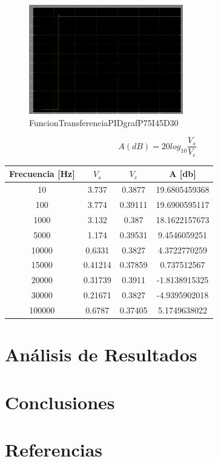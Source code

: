 \documentclass[]{article}
\begin{document}
\begin{figure}[h!]
	\centering
	\includegraphics[width=0.6\textwidth]{Imagenes/FuncionTransferenciaPIDgrafP75I45D30}
	\caption{FuncionTransferenciaPIDgrafP75I45D30}
	\label{FuncionTransferenciaPIDgrafP75I45D30}
\end{figure}



\begin{equation}
A(dB)=20log_{10}\frac{V_s}{V_e}
\end{equation}




\begin{table}[h!]
	\centering
	\begin{tabular}{|c|c|c|c|}
		\hline
		Frecuencia [Hz] & $V_s$    & $V_e$    & A [db]    \\ \hline
		10                  & 3.737   & 0.3877  & 19.6805459368 \\ \hline
		100                 & 3.774   & 0.39111 & 19.6900595117 \\ \hline
		1000                & 3.132   & 0.387   & 18.1622157673 \\ \hline
		5000                & 1.174   & 0.39531 & 9.4546059251  \\ \hline
		10000               & 0.6331  & 0.3827  & 4.3722770259  \\ \hline
		15000               & 0.41214 & 0.37859 & 0.737512567   \\ \hline
		20000               & 0.31739 & 0.3911  & -1.8138915325 \\ \hline
		30000               & 0.21671 & 0.3827  & -4.9395902018 \\ \hline
		100000              & 0.6787  & 0.37405 & 5.1749638022  \\ \hline
	\end{tabular}
	\label{ATabla}
\end{table}






\section{Análisis de Resultados}



\section{Conclusiones}


\section{Referencias}



\end{document}
